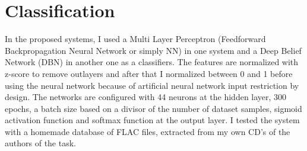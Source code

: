 \documentclass{article}
\begin{document}
\section{Classification}\label{sec:classification}
In the proposed systems, I used a Multi Layer Perceptron (Feedforward Backpropagation Neural Network or simply NN) in one system and a Deep Belief Network (DBN) in another one as a classifiers. The features are normalized with z-score to remove outlayers and after that I normalized between 0 and 1 before using the neural network because of artificial neural network input restriction by design. The networks are configured with 44 neurons at the hidden layer, 300 epochs, a batch size based on a divisor of the number of dataset samples, sigmoid activation function and softmax function at the output layer. I tested the system with a homemade database of FLAC files, extracted from my own CD's of the authors of the task.
\end{document}
